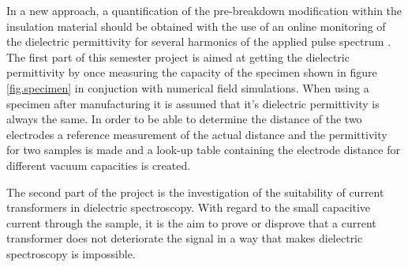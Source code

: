 In a new approach, a quantification of the pre-breakdown modification within the insulation material should be obtained with the use of an online monitoring of the dielectric permittivity for several harmonics of the applied pulse spectrum \cite{FaerberMVISS}.
The first part of this semester project is aimed at getting the dielectric permittivity by once measuring the capacity of the specimen shown in figure \ref{fig.specimen} in conjuction with numerical field simulations. When using a specimen after manufacturing it is assumed that it's dielectric permittivity is always the same. In order to be able to determine the distance of the two electrodes a reference measurement of the actual distance and the permittivity for two samples is made and a look-up table containing the electrode distance for different vacuum capacities is created. 

The second part of the project is the investigation of the suitability of current transformers in dielectric spectroscopy. With regard to the small capacitive current through the sample, it is the aim to prove or disprove that a current transformer does not deteriorate the signal in a way that makes dielectric spectroscopy is impossible. 

